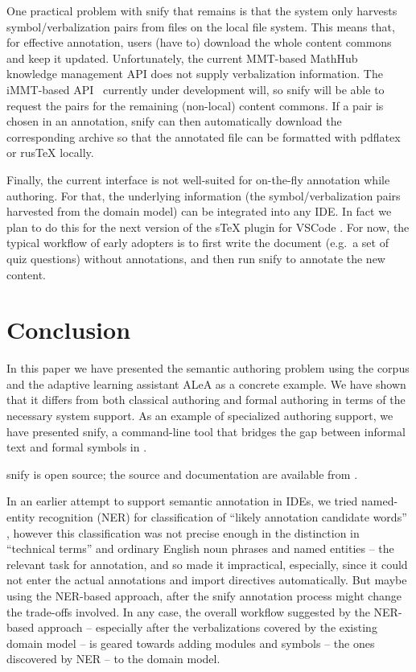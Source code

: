 \documentclass{llncs}
\newcommand\ALeA{\textsf{ALeA}\xspace}
\newcommand\snify{\textsf{snify}\xspace}
\begin{document}
One practical problem with \snify that remains is that the system only harvests
symbol/verbalization pairs from \sTeX files on the local file system. This means that, for
effective annotation, users (have to) download the whole content commons and keep it
updated. Unfortunately, the current MMT-based MathHub knowledge management
API does not supply verbalization information. The iMMT-based
API~\cite{iMMT:on} currently under development will, so \snify will be able to request the
pairs for the remaining (non-local) content commons. If a pair is chosen in an annotation,
\snify can then automatically download the corresponding archive so that the annotated
file can be formatted with pdflatex or rusTeX locally.

Finally, the current interface is not well-suited for on-the-fly annotation while
authoring.
For that, the underlying information (the symbol/verbalization pairs harvested
from the domain model) can be integrated into any IDE. In fact we plan to do this for the
next version of the sTeX plugin for VSCode \cite{sTeX-IDE:git}.
For now, the typical workflow of early adopters is to first write the document (e.g.\ a set of quiz questions) without annotations, and then run \snify to annotate the new content.

\section{Conclusion}\label{sec:conclusion}

In this paper we have presented the semantic authoring problem using the \sTeX corpus and
the adaptive learning assistant \ALeA as a concrete example. We have shown that it differs
from both classical authoring and formal authoring in terms of the necessary system
support. As an example of specialized authoring support, we have presented \snify, a
command-line tool that bridges the gap between informal text and formal symbols in \sTeX.

\snify is open source; the source and documentation are available from
\cite{stextools:git}.

In an earlier attempt to support semantic annotation in IDEs, we tried named-entity
recognition (NER) for classification of ``likely annotation candidate words''
\cite{hutterer:msc23}, however this classification was not precise enough in the
distinction in ``technical terms'' and ordinary English noun phrases and named entities --
the relevant task for annotation, and so made it impractical, especially, since it could
not enter the actual annotations and import directives automatically. But maybe using the
NER-based approach, after the \snify annotation process might change the trade-offs
involved. In any case, the overall workflow suggested by the NER-based approach --
especially after the verbalizations covered by the existing domain model -- is geared towards adding modules and symbols -- the ones discovered by NER
-- to the domain model. 

\printbibliography
\end{document}
